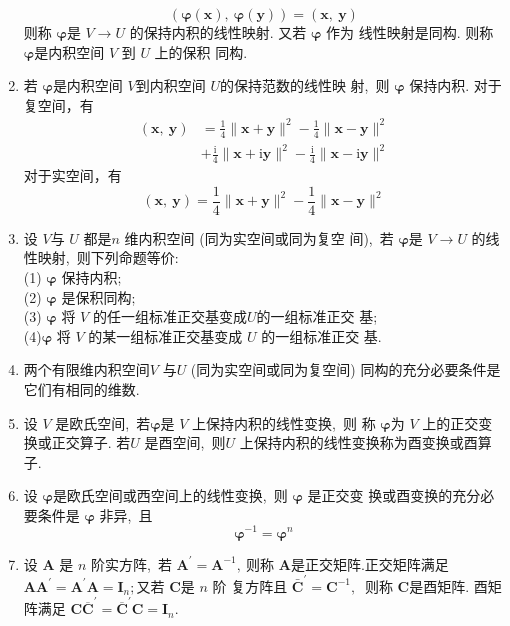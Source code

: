 \begin{enumerate}
		$$(\boldsymbol{\varphi}(\boldsymbol{x}),\  \boldsymbol{\varphi}(\boldsymbol{y}))=(\boldsymbol{x},\  \boldsymbol{y})$$
		则称 $ \boldsymbol{\varphi} $是 $ V \rightarrow U $ 的保持内积的线性映射. 又若  $\boldsymbol{\varphi}$  作为 线性映射是同构. 则称 $ \boldsymbol{\varphi} $是内积空间 $ V $ 到  $U$  上的保积 同构.
		\item 若  $\boldsymbol{\varphi}$是内积空间  $V  $到内积空间  $U  $的保持范数的线性映 射,\  则  $\boldsymbol{\varphi} $ 保持内积.
		对于复空间，有
		$$\begin{aligned}
			(\boldsymbol{x},\  \boldsymbol{y}) &=\frac{1}{4}\|\boldsymbol{x}+\boldsymbol{y}\|^{2}-\frac{1}{4}\|\boldsymbol{x}-\boldsymbol{y}\|^{2} \\
			&+\frac{\mathrm{i}}{4}\|\boldsymbol{x}+\mathrm{i} \boldsymbol{y}\|^{2}-\frac{\mathrm{i}}{4}\|\boldsymbol{x}-\mathrm{i} \boldsymbol{y}\|^{2}
		\end{aligned}$$
		对于实空间，有
		$$(\boldsymbol{x},\  \boldsymbol{y})=\frac{1}{4}\|\boldsymbol{x}+\boldsymbol{y}\|^{2}-\frac{1}{4}\|\boldsymbol{x}-\boldsymbol{y}\|^{2}$$
		\item 设  $V  $与 $ U $ 都是$  n$  维内积空间 (同为实空间或同为复空 间),\  若  $\boldsymbol{\varphi} $是 $ V \rightarrow U$  的线性映射,\  则下列命题等价:\\
		(1)  $\boldsymbol{\varphi} $ 保持内积;\\
		(2) $ \boldsymbol{\varphi} $ 是保积同构;\\
		(3) $ \boldsymbol{\varphi}$  将  $V $ 的任一组标准正交基变成$  U  $的一组标准正交 基;\\
		(4)$ \boldsymbol{\varphi} $ 将  $V$  的某一组标准正交基变成  $U $ 的一组标准正交 基.
		\item 两个有限维内积空间$  V $ 与$  U $ (同为实空间或同为复空间) 同构的充分必要条件是它们有相同的维数.
		\item 设 $ V $ 是欧氏空间,\  若$  \boldsymbol{\varphi}  $是 $ V$  上保持内积的线性变换,\  则 称  $\boldsymbol{\varphi}  $为 $ V $ 上的正交变换或正交算子. 若$  U$  是酉空间,\  则$  U$  上保持内积的线性变换称为酉变换或酉算子.
		\item 设  $\boldsymbol{\varphi} $是欧氏空间或西空间上的线性变换,\  则  $\boldsymbol{\varphi}$ 是正交变 换或酉变换的充分必要条件是  $\boldsymbol{\varphi}$  非异,\  且
		$$\boldsymbol{\varphi}^{-1}=\boldsymbol{\varphi}^{n}$$
		\item 设  $\boldsymbol{A}$  是  $n$  阶实方阵,\  若  $\boldsymbol{A}^{\prime}=\boldsymbol{A}^{-1} ,\  $则称 $ \boldsymbol{A}  $是正交矩阵.正交矩阵满足  $\boldsymbol{A} \boldsymbol{A}^{\prime}=\boldsymbol{A}^{\prime} \boldsymbol{A}=\boldsymbol{I}_{n} ; $又若 $ \boldsymbol{C}  $是  $n$  阶 复方阵且 $ \bar{\boldsymbol{C}}^{\prime}=\boldsymbol{C}^{-1} ,\ $ 则称  $\boldsymbol{C}  $是酉矩阵. 酉矩阵满足  $\boldsymbol{C}\overline{\boldsymbol{C}}^{\prime}=\overline{\boldsymbol{C}}^{\prime} \boldsymbol{C}=\boldsymbol{I}_{n} .$

\end{enumerate}
